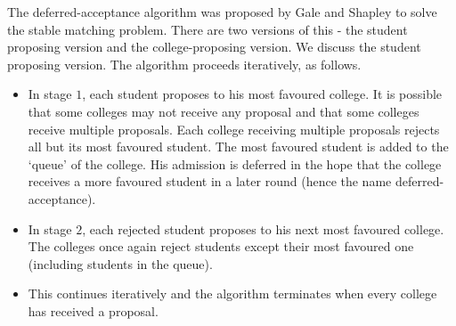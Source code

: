 \documentclass{article}
\theoremstyle{definition}
\begin{document}
The deferred-acceptance algorithm was proposed by Gale and Shapley to solve the stable matching problem. There are two versions of this - the student proposing version and the college-proposing version. We discuss the student proposing version. The algorithm proceeds iteratively, as follows.
\begin{itemize}
    \item In stage $1$, each student proposes to his most favoured college. It is possible that some colleges may not receive any proposal and that some colleges receive multiple proposals. Each college receiving multiple proposals rejects all but its most favoured student. The most favoured student is added to the `queue' of the college. His admission is deferred in the hope that the college receives a more favoured student in a later round (hence the name deferred-acceptance). 
    \item In stage $2$, each rejected student proposes to his next most favoured college. The colleges once again reject students except their most favoured one (including students in the queue).
    \item This continues iteratively and the algorithm terminates when every college has received a proposal. 
\end{itemize}
\end{document}
